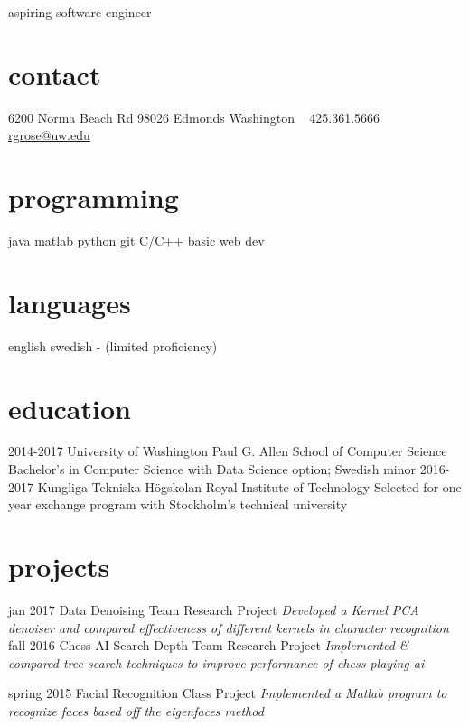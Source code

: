 \documentclass[]{friggeri-cv}
\begin{document}
       {aspiring software engineer}


\begin{aside}
  \section{contact}
    6200 Norma Beach Rd
    98026 Edmonds
    Washington
    ~
    425.361.5666
    \href{mailto:rgrose@uw.edu}{rgrose@uw.edu}
    \href{https://www.linkedin.com/in/ryanwgrose}{\faLinkedin}
  \section{programming}
    java
    matlab
    python
    git
    C/C++
    basic web dev
  \section{languages}
    english
    swedish -
    (limited proficiency)
\end{aside}

\section{education}

\begin{entrylist}
  \entry
    {2014-2017}
    {University of Washington}
    {Paul G. Allen School of Computer Science}
    {Bachelor's in Computer Science with Data Science option; Swedish minor}
  \entry
    {2016-2017}
    {Kungliga Tekniska Högskolan}
    {Royal Institute of Technology }
    {Selected for one year exchange program with Stockholm's technical university}
\end{entrylist}

\section{projects}

\begin{entrylist}
  \entry
    {jan 2017}
    {Data Denoising}
    {Team Research Project}
    {\emph{Developed a Kernel PCA denoiser and compared effectiveness of different kernels in character recognition}}
  \entry
    {fall 2016}
    {Chess AI Search Depth}
    {Team Research Project}
    {\emph{Implemented \& compared tree search techniques to improve performance of chess playing ai}}

  \entry
    {spring 2015}
    {Facial Recognition}
    {Class Project}
    {\emph{Implemented a Matlab program to recognize faces based off the eigenfaces method}}
\end{entrylist}
\end{document}

